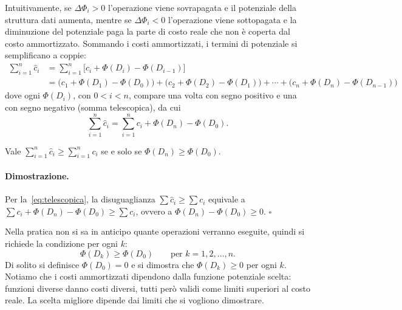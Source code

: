 Intuitivamente, se $\Delta\Phi_i > 0$ l'operazione viene sovrapagata e il potenziale della struttura dati aumenta, mentre se $\Delta\Phi_i < 0$ l'operazione viene sottopagata e la diminuzione del potenziale paga la parte di costo reale che non è coperta dal costo ammortizzato. Sommando i costi ammortizzati, i termini di potenziale si semplificano a coppie:
\begin{align*}
\sum_{i=1}^{n} \hat{c}_i &= \sum_{i=1}^{n} \big[c_i + \Phi(D_i) - \Phi(D_{i-1})\big] \\
&= \big(c_1 + \Phi(D_1) - \Phi(D_0)\big) + \big(c_2 + \Phi(D_2) - \Phi(D_1)\big) + \cdots + \big(c_n + \Phi(D_n) - \Phi(D_{n-1})\big)
\end{align*}
dove ogni $\Phi(D_i)$, con $0 < i < n$, compare una volta con segno positivo e una con segno negativo (somma telescopica), da cui
\begin{equation}\label{eq:telescopica}
\sum_{i=1}^{n} \hat{c}_i = \sum_{i=1}^{n} c_i + \Phi(D_n) - \Phi(D_0).
\end{equation}

\begin{lemma}\label{lem:potenziale}
Vale $\displaystyle\sum_{i=1}^{n} \hat{c}_i \ge \sum_{i=1}^{n} c_i$ se e solo se $\Phi(D_n) \ge \Phi(D_0)$.
\end{lemma}

\paragraph{Dimostrazione.}
Per la~\eqref{eq:telescopica}, la disuguaglianza $\sum \hat{c}_i \ge \sum c_i$ equivale a $\sum c_i + \Phi(D_n) - \Phi(D_0) \ge \sum c_i$, ovvero a $\Phi(D_n) - \Phi(D_0) \ge 0$. \hfill $\square$

Nella pratica non si sa in anticipo quante operazioni verranno eseguite, quindi si richiede la condizione per ogni $k$:
\[
\Phi(D_k) \ge \Phi(D_0) \qquad \text{per } k = 1,2,\dots,n.
\]
Di solito si definisce $\Phi(D_0) = 0$ e si dimostra che $\Phi(D_k) \ge 0$ per ogni $k$. Notiamo che i costi ammortizzati dipendono dalla funzione potenziale scelta: funzioni diverse danno costi diversi, tutti però validi come limiti superiori al costo reale. La scelta migliore dipende dai limiti che si vogliono dimostrare.

